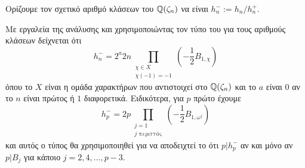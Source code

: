 \begin{defn}
	Ορίζουμε τον σχετικό αριθμό κλάσεων του $\mathbb{Q}(\zeta_n)$ να είναι $h_n^- := h_n/h^+_n$.
\end{defn}

\noindent Με εργαλεία της ανάλυσης και χρησιμοποιώντας τον τύπο του  για τους αριθμούς κλάσεων δείχνεται ότι
\begin{equation*}
	h_n^- = 2^a 2n \prod\limits_{ \substack{ \chi \in X \\ \chi(-1)=-1}} \left(-\frac{1}{2} B_{1,\chi}\right)
\end{equation*}
όπου το $X$ είναι η ομάδα χαρακτήρων που αντιστοιχεί στο $\mathbb{Q}(\zeta_n)$ και το $a$ είναι $0$ αν το $n$ είναι πρώτος ή $1$ διαφορετικά. Ειδικότερα, για $p$ πρώτο έχουμε
\begin{equation}
	h^-_p = 2p \prod\limits_{\substack{j = 1 \\ j \text{ περιττός}}} \left(-\frac{1}{2} B_{1,\omega^j}\right) \label{3.1}
\end{equation}
και αυτός ο τύπος θα χρησιμοποιηθεί για να αποδειχτεί το ότι $p|h^-_p$ αν και μόνο αν $p|B_j$ για κάποιο $j=2,4,\ldots,p-3$.